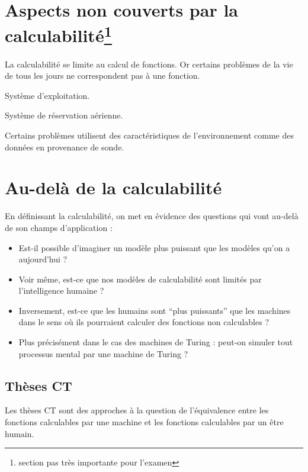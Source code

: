 \section{Aspects non couverts par la calculabilité\protect\footnote{section pas très importante pour l'examen}}
\label{sub:aspects_non_couvert_par_la_calculabilit_}
La calculabilité se limite au calcul de fonctions. Or certains problèmes de la vie de tous les jours ne correspondent pas à une fonction.

\begin{myexem}
Système d'exploitation.
\end{myexem}

\begin{myexem}
Système de réservation aérienne.
\end{myexem}

\begin{myexem}
Certains problèmes utilisent des caractéristiques de l'environnement comme des données en provenance de sonde.
\end{myexem}

\section{Au-delà de la calculabilité}
\label{sub:au_del_de_la_calculabilit_}
En définissant la calculabilité, on met en évidence des questions qui vont au-delà de son champs d'application :
\begin{itemize}
	\item Est-il possible d'imaginer un modèle plus puissant que les modèles qu'on a aujourd'hui ?
	\item Voir même, est-ce que nos modèles de calculabilité sont limités par l'intelligence humaine ?
	\item Inversement, est-ce que les humains sont ``plus puissants'' que les machines dans le sens où ils pourraient calculer des fonctions non calculables ?
	\item Plus précisément dans le cas des machines de Turing : peut-on simuler tout processus mental par une machine de Turing ?
\end{itemize}
 

\subsection{Thèses CT}
Les thèses CT sont des approches à la question de l'équivalence entre les fonctions calculables par une machine et les fonctions calculables par un être humain.

